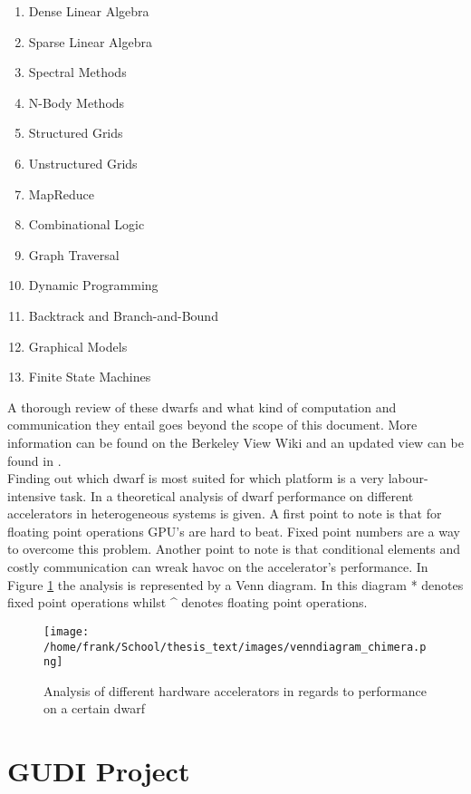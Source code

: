 \begin{multicols}{2}
\begin{enumerate}
\item Dense Linear Algebra
\item Sparse Linear Algebra
\item Spectral Methods
\item N-Body Methods
\item Structured Grids
\item Unstructured Grids
\item MapReduce
\item Combinational Logic
\item Graph Traversal
\item Dynamic Programming
\item Backtrack and Branch-and-Bound
\item Graphical Models
\item Finite State Machines
\end{enumerate}
\end{multicols}

A thorough review of these dwarfs and what kind of computation and communication they entail goes beyond the scope of this document. More information can be found on the Berkeley View Wiki \cite{anon._dwarf_????} and an updated view can be found in \cite{asanovic_view_2009}.\\
Finding out which dwarf is most suited for which platform is a very labour-intensive task. In \cite{inta_chimera:_2012} a theoretical analysis of dwarf performance on different accelerators in heterogeneous systems is given. A first point to note is that for floating point operations GPU's are hard to beat. Fixed point numbers are a way to overcome this problem. Another point to note is that conditional elements and  costly communication can wreak havoc on the accelerator's performance. In Figure \ref{img:venndiagram_chimera} the analysis is represented by a Venn diagram. In this diagram * denotes fixed point operations whilst \^{} denotes floating point operations.

\begin{figure}[H]
\centering
\texttt{[image: /home/frank/School/thesis\_text/images/venndiagram\_chimera.png]}
\caption{Analysis of different hardware accelerators in regards to performance on a certain dwarf \cite{inta_chimera:_2012} }
\label{img:venndiagram_chimera}
\end{figure}


\section{GUDI Project}

